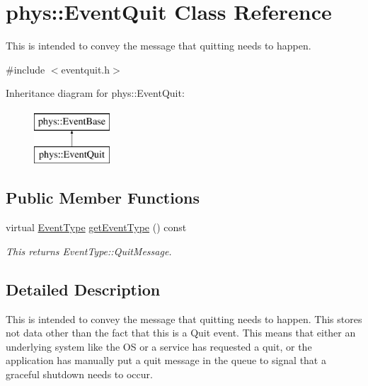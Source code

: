 \hypertarget{classphys_1_1EventQuit}{
\section{phys::EventQuit Class Reference}
\label{dd/dea/classphys_1_1EventQuit}
}


This is intended to convey the message that quitting needs to happen.  




{\ttfamily \#include $<$eventquit.h$>$}

Inheritance diagram for phys::EventQuit:\begin{figure}[H]
\begin{center}
\leavevmode
\includegraphics[height=2cm]{dd/dea/classphys_1_1EventQuit}
\end{center}
\end{figure}
\subsection*{Public Member Functions}
\begin{DoxyCompactItemize}
\item 
virtual \hyperlink{classphys_1_1EventBase_a5e6a8564e127f654123f0bf6a2751923}{EventType} \hyperlink{classphys_1_1EventQuit_ad996640acbb58d2a17fc405de6515c93}{getEventType} () const 
\begin{DoxyCompactList}\small\item\em This returns EventType::QuitMessage. \item\end{DoxyCompactList}\end{DoxyCompactItemize}


\subsection{Detailed Description}
This is intended to convey the message that quitting needs to happen. This stores not data other than the fact that this is a Quit event. This means that either an underlying system like the OS or a service has requested a quit, or the application has manually put a quit message in the queue to signal that a graceful shutdown needs to occur. 

